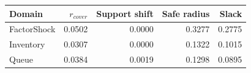 \begin{tabular}{lrrrr}
\toprule
Domain & $r_{cover}$ & Support shift & Safe radius & Slack \\
\midrule
FactorShock & 0.0502 & 0.0000 & 0.3277 & 0.2775 \\
Inventory & 0.0307 & 0.0000 & 0.1322 & 0.1015 \\
Queue & 0.0384 & 0.0019 & 0.1298 & 0.0895 \\
\bottomrule
\end{tabular}
